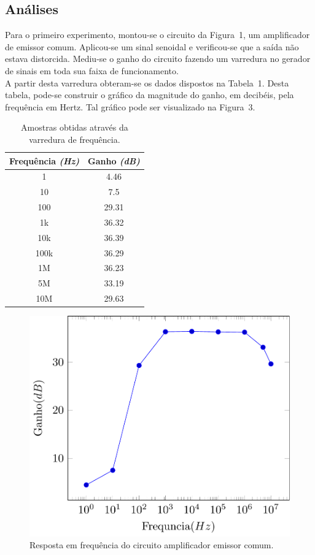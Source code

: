 \documentclass[12pt,a4paper]{article}
\begin{document}
\subsection{Análises}

Para o primeiro experimento, montou-se o circuito da Figura~1, um amplificador de emissor comum. 
Aplicou-se um sinal senoidal e verificou-se que a saída não estava distorcida.
Mediu-se o ganho do circuito fazendo um varredura no gerador de sinais em 
toda sua faixa de funcionamento.\\ A partir desta varredura obteram-se os dados dispostos na 
Tabela~1. Desta tabela, pode-se construir o gráfico da magnitude do ganho, em decibéis, pela frequência
em Hertz. Tal gráfico pode ser visualizado na Figura~3.
\begin{table}[htpb]
  \centering
  \caption{Amostras obtidas através da varredura de frequência.}
  \label{tab:label}

  \begin{tabular}{c c}
                   \\ \toprule
    Frequência \emph{(Hz)}  & Ganho \emph{(dB)} \\ \midrule
      1             & 4.46  \\ \midrule
      10            & 7.5   \\ \midrule
      100           & 29.31 \\ \midrule
      1k          & 36.32 \\ \midrule
      10k         & 36.39 \\ \midrule
      100k       & 36.29 \\ \midrule
      1M       & 36.23 \\ \midrule
      5M       & 33.19 \\ \midrule
      10M      & 29.63 \\ \bottomrule
  \end{tabular}
\end{table}
\begin{figure}[htpb]
  \centering
  \includegraphics[width=0.8\linewidth]{img/bode.pdf}
  \caption{Resposta em frequência do circuito amplificador emissor comum.}
  \label{fig:3}
\end{figure}
\end{document}
